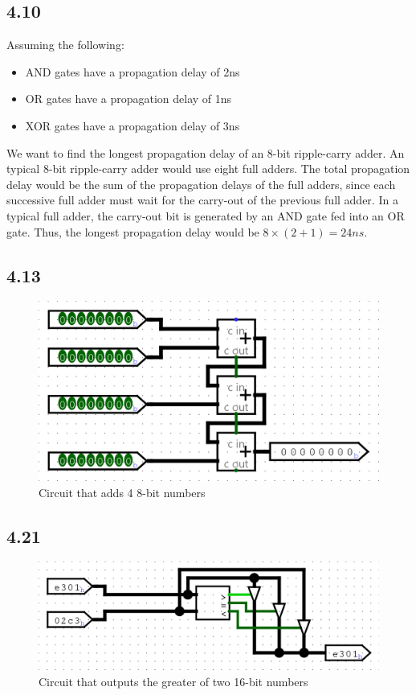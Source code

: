 \documentclass{article}
\begin{document}
\subsection*{4.10}
Assuming the following:
\begin{itemize}
    \item AND gates have a propagation delay of 2ns
    \item OR gates have a propagation delay of 1ns
    \item XOR gates have a propagation delay of 3ns
\end{itemize}
\noindent We want to find the longest propagation delay of an 8-bit ripple-carry adder.
An typical 8-bit ripple-carry adder would use eight full adders.
The total propagation delay would be the sum of the propagation delays of the full adders, since each successive full adder must wait for the carry-out of the previous full adder.
In a typical full adder, the carry-out bit is generated by an AND gate fed into an OR gate.
Thus, the longest propagation delay would be $8 \times (2 + 1) = 24ns$.

\subsection*{4.13}
\begin{figure}[H]
    \centering
    \includegraphics[width=0.9\linewidth]{./images/4.13.png}
    \caption*{Circuit that adds 4 8-bit numbers}
\end{figure}

\subsection*{4.21}
\begin{figure}[H]
    \centering
    \includegraphics[width=0.9\linewidth]{./images/4.21.png}
    \caption*{Circuit that outputs the greater of two 16-bit numbers}
\end{figure}
\end{document}
